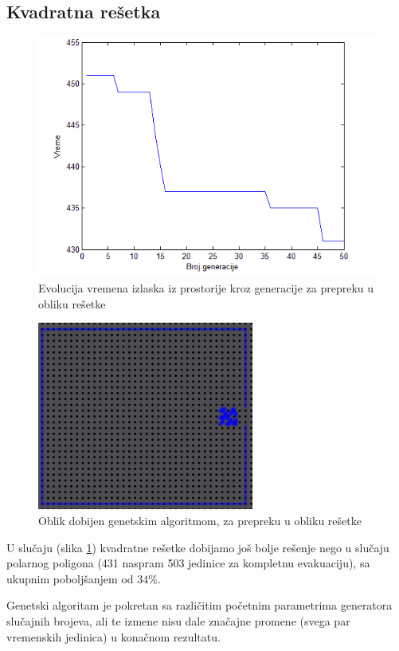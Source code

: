 \documentclass[12pt]{article}
\begin{document}
\subsection*{Kvadratna rešetka} 

\begin{figure}
\centering
\includegraphics[scale=.6]{Grid-plot}
\caption{Evolucija vremena izlaska iz prostorije kroz generacije za prepreku u obliku rešetke}
\end{figure}

\begin{figure}[h]
\centering
\includegraphics{grid1}
\caption{Oblik dobijen genetskim algoritmom, za prepreku u obliku rešetke}
\label{fig:grid1}
\end{figure}
U slučaju (slika \ref{fig:grid1}) kvadratne rešetke dobijamo još bolje rešenje nego u slučaju polarnog poligona (431 naspram 503 jedinice za kompletnu evakuaciju), sa ukupnim poboljšanjem od $34\%$.

Genetski algoritam je pokretan sa različitim početnim parametrima generatora slučajnih brojeva, ali te izmene nisu dale značajne promene (svega par vremenskih jedinica) u konačnom rezultatu.
\end{document}
